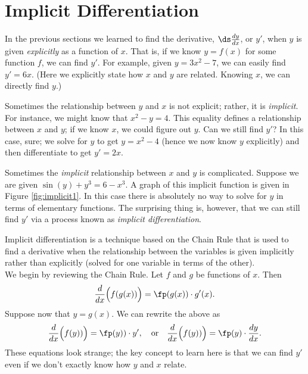 \section{Implicit Differentiation}\label{sec:imp_deriv}

In the previous sections we learned to find the derivative, $\ds \frac{dy}{dx}$, or $y'$, when $y$ is given \textit{explicitly} as a function of $x$. That is, if we know $y=f(x)$ for some function $f$, we can find $y'$. For example, given  $y=3x^2-7$, we can easily find $y'=6x$. (Here we explicitly state how $x$ and $y$ are related. Knowing $x$, we can directly find $y$.)

Sometimes the relationship between $y$ and $x$ is not explicit; rather, it is \textit{implicit}. For instance, we might know that $x^2-y=4$. This equality defines a relationship between $x$ and $y$; if we know $x$, we could figure out $y$. Can we still find $y'$?  In this case, sure; we  solve for $y$ to get $y=x^2-4$ (hence we now know $y$ explicitly)  and then differentiate to get $y'=2x$.

Sometimes the \textit{implicit} relationship between $x$ and $y$ is complicated.  Suppose we are given $\sin(y)+y^3=6-x^3$. A graph of this implicit function is given in Figure \ref{fig:implicit1}. In this case there is absolutely no way to solve for $y$ in terms of elementary functions.  The surprising thing is, however, that we can still find $y'$ via a process known as \emph{implicit differentiation}.


Implicit differentiation is a technique based on the Chain Rule that is used to find a derivative when the relationship between the variables is given implicitly rather than explicitly (solved for one variable in terms of the other). \\

We begin by reviewing the Chain Rule. Let $f$ and $g$ be functions of $x$. Then $$\frac{d}{dx}\Big(f(g(x))\Big) = \fp(g(x))\cdot g'(x).$$ Suppose now that $y=g(x)$. We can rewrite the above as \begin{equation}\frac{d}{dx}\Big(f(y))\Big) = \fp(y))\cdot y', \quad \text{or}\quad \frac{d}{dx}\Big(f(y))\Big)= \fp(y)\cdot \frac{dy}{dx} .\label{eq:implicit1}\end{equation} These equations look strange; the key concept to learn here is that we can find $y'$ even if we don't exactly know how $y$ and $x$ relate.\\

